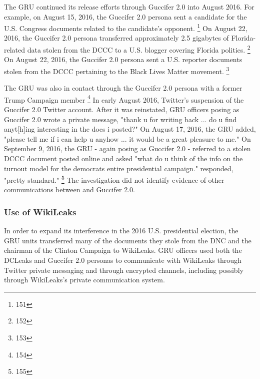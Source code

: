 The GRU continued its release efforts through Guccifer 2.0 into August 2016.
For example, on August 15, 2016, the Guccifer 2.0 persona sent a candidate for the U.S. Congress documents related to the candidate's opponent.%
\footnote{151}
On August 22, 2016, the Guccifer 2.0 persona transferred approximately 2.5 gigabytes of Florida-related data stolen from the DCCC to a U.S. blogger covering Florida politics.%
\footnote{152}
On August 22, 2016, the Guccifer 2.0 persona sent a U.S. reporter documents stolen from the DCCC pertaining to the Black Lives Matter movement.%
\footnote{153}

The GRU was also in contact through the Guccifer 2.0 persona with  a former Trump Campaign member %
\footnote{154}
In early August 2016,  Twitter's suspension of the Guccifer 2.0 Twitter account.
After it was reinstated, GRU officers posing as Guccifer 2.0 wrote  a private message, "thank u for writing back ... do u find anyt[h]ing interesting in the docs i posted?"
On August 17, 2016, the GRU added, "please tell me if i can help u anyhow ... it would be a great pleasure to me."
On September 9, 2016, the GRU - again posing as Guccifer 2.0 - referred to a stolen DCCC document posted online and asked  "what do u think of the info on the turnout model for the democrats entire presidential campaign."
 responded, "pretty standard."%
\footnote{155}
The investigation did not identify evidence of other communications between  and Guccifer 2.0.

\subsubsection{Use of WikiLeaks}

In order to expand its interference in the 2016 U.S. presidential election, the GRU units transferred many of the documents they stole from the DNC and the chairman of the Clinton Campaign to WikiLeaks.
GRU officers used both the DCLeaks and Guccifer 2.0 personas to communicate with WikiLeaks through Twitter private messaging and through encrypted channels, including possibly through WikiLeaks's private communication system.

